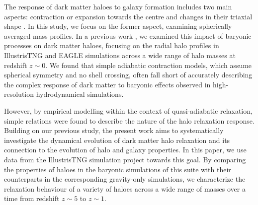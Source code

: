 The response of dark matter haloes to galaxy formation includes two main aspects: contraction or expansion towards the centre and changes in their triaxial shape \citep[][]{2004ApJ...616...16G,2006PhRvD..74l3522G,2010MNRAS.402..776P,2010MNRAS.406..922T,2010MNRAS.405.2161D,2010MNRAS.407..435A,2011MNRAS.414..195T,2016MNRAS.461.2658D,2019A&A...622A.197A,2022MNRAS.511.3910F,2023Velmani&Paranjape}. 
In this study, we focus on the former aspect, examining spherically averaged mass profiles.
In a previous work \cite{2023Velmani&Paranjape}, we examined this impact of baryonic processes on dark matter haloes, focusing on the radial halo profiles in IllustrisTNG and EAGLE simulations across a wide range of halo masses at redshift $z \sim 0$. We found that simple adiabatic contraction models, which assume spherical symmetry and no shell crossing, often fall short of accurately describing the complex response of dark matter to baryonic effects observed in high-resolution hydrodynamical simulations.

However, by empirical modelling within the context of quasi-adiabatic relaxation, simple relations were found to describe the nature of the halo relaxation response. 
Building on our previous study, the present work aims to systematically investigate the dynamical evolution of dark matter halo relaxation and its connection to the evolution of halo and galaxy properties. In this paper, we use data from the IllustrisTNG simulation project towards this goal. By comparing the properties of haloes in the baryonic simulations of this suite with their counterparts in the corresponding gravity-only simulations, we characterize the relaxation behaviour of a variety of haloes across a wide range of masses over a time from redshift $z \sim 5$ to $z \sim 1$.

